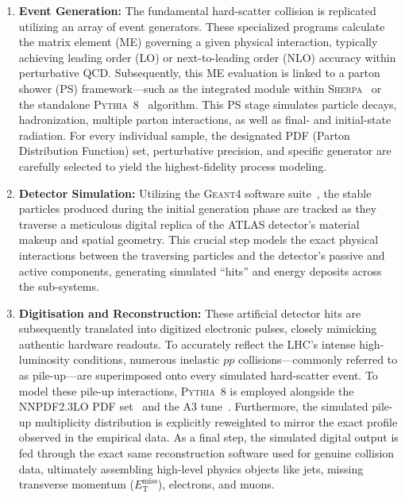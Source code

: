 \begin{enumerate}
    \item \textbf{Event Generation:} The fundamental hard-scatter collision is replicated utilizing an array of event generators. These specialized programs calculate the matrix element (ME) governing a given physical interaction, typically achieving leading order (LO) or next-to-leading order (NLO) accuracy within perturbative QCD. Subsequently, this ME evaluation is linked to a parton shower (PS) framework—such as the integrated module within \textsc{Sherpa}~\cite{Bothmann_2019} or the standalone \textsc{Pythia}~8~\cite{Sjostrand:2014zea} algorithm. This PS stage simulates particle decays, hadronization, multiple parton interactions, as well as final- and initial-state radiation. For every individual sample, the designated PDF (Parton Distribution Function) set, perturbative precision, and specific generator are carefully selected to yield the highest-fidelity process modeling.

    \item \textbf{Detector Simulation:} Utilizing the \textsc{Geant4} software suite~\cite{GEANT4:2002zbu}, the stable particles produced during the initial generation phase are tracked as they traverse a meticulous digital replica of the ATLAS detector's material makeup and spatial geometry. This crucial step models the exact physical interactions between the traversing particles and the detector's passive and active components, generating simulated ``hits'' and energy deposits across the sub-systems.

    \item \textbf{Digitisation and Reconstruction:} These artificial detector hits are subsequently translated into digitized electronic pulses, closely mimicking authentic hardware readouts. To accurately reflect the LHC's intense high-luminosity conditions, numerous inelastic $pp$ collisions—commonly referred to as pile-up—are superimposed onto every simulated hard-scatter event. To model these pile-up interactions, \textsc{Pythia}~8 is employed alongside the \textsc{NNPDF2.3LO} PDF set~\cite{Ball:2012cx} and the A3 tune~\cite{ATL-PHYS-PUB-2016-017}. Furthermore, the simulated pile-up multiplicity distribution is explicitly reweighted to mirror the exact profile observed in the empirical data. As a final step, the simulated digital output is fed through the exact same reconstruction software used for genuine collision data, ultimately assembling high-level physics objects like jets, missing transverse momentum ($E_{\text{T}}^{\text{miss}}$), electrons, and muons.
\end{enumerate}

